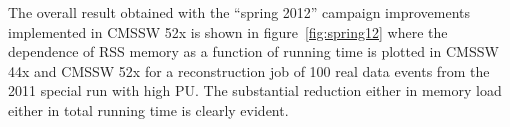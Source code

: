 The overall result obtained with the ``spring 2012'' campaign
improvements implemented in CMSSW 52x is shown in
figure~\ref{fig:spring12} where the dependence of RSS memory as a
function of running time is plotted in CMSSW 44x and CMSSW 52x for a
reconstruction job of 100 real data events from the 2011 special
run with high PU. The substantial reduction either in memory load
either in total running time is clearly evident.






